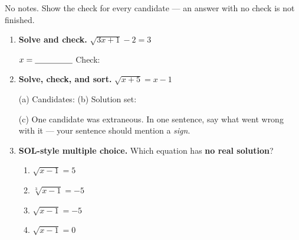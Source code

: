 \documentclass[10pt]{article}
\begin{document}
\namedateperiod

\vspace{0.08in}

No notes. Show the check for every candidate --- an answer with no check is not finished.

\begin{enumerate}[leftmargin=1.8em, itemsep=10pt]
  \item \textbf{Solve and check.} \; $\sqrt{3x+1}-2=3$
        \vspace{0.75in}

        $x=\blank{1.6cm}$ \hspace{0.3in} Check: \blank{5.0cm}

  \item \textbf{Solve, check, and sort.} \; $\sqrt{x+5}=x-1$
        \vspace{1.05in}

        (a) Candidates: \blank{3.0cm} \hspace{0.2in} (b) Solution set: \blank{2.6cm}

        \vspace{5pt}
        (c) One candidate was extraneous. In one sentence, say what went wrong with it --- your
        sentence should mention a \emph{sign}. \writeline

  \item \textbf{SOL-style multiple choice.} Which equation has \textbf{no real solution}?
        \begin{enumerate}[label=\Alph*., leftmargin=1.9em, itemsep=1pt]
          \item $\sqrt{x-1}=5$
          \item $\sqrt[3]{x-1}=-5$
          \item $\sqrt{x-1}=-5$
          \item $\sqrt{x-1}=0$
        \end{enumerate}
\end{enumerate}
\end{document}
